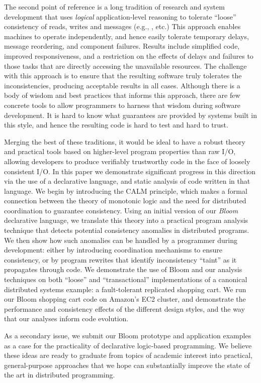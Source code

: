 The second point of reference is a long tradition of research and system development that uses {\em logical} application-level reasoning to tolerate ``loose'' consistency of reads, writes and messages (e.g., \cite{sagas,base,acid20,quicksand}, etc.)  This approach enables machines to operate independently, and hence easily tolerate temporary delays, message reordering, and component failures.  Results include simplified code, improved responsiveness, and a restriction on the effects of delays and failures to those tasks that are directly accessing the unavailable resources.  The challenge with this approach is to ensure that the resulting software truly tolerates the inconsistencies, producing acceptable results in all cases.  Although there is a body of wisdom and best practices that informs this approach, there are few concrete tools to allow programmers to harness that wisdom during software development.  It is hard to know what guarantees are provided by systems built in this style, and hence the resulting code is hard to test and hard to trust.  

Merging the best of these traditions, it would be ideal to have a robust theory and practical tools based on higher-level program properties than raw I/O, allowing developers to produce verifiably trustworthy code in the face of loosely consistent I/O.  In this paper we demonstrate significant progress in this direction via the use of a declarative language, and static analysis of code written in that language.  We begin by introducing the CALM principle, which makes a formal connection between the theory of monotonic logic and the need for distributed coordination to guarantee consistency.  Using an initial version of our {\em Bloom} declarative language, we translate this theory into a practical program analysis technique that detects potential consistency anomalies in distributed programs.  We then show how such anomalies can be handled by a programmer during development: either by introducing coordination mechanisms to ensure consistency, or by program rewrites that identify inconsistency ``taint'' as it propagates through code.  We demonstrate the use of Bloom and our analysis techniques on both ``loose'' and ``transactional'' implementations of a canonical distributed systems example: a fault-tolerant replicated shopping cart.  We run our Bloom shopping cart code on Amazon's EC2 cluster, and demonstrate the performance and consistency effects of the different design styles, and the way that our analyses inform code evolution.

As a secondary issue, we submit our Bloom prototype and application examples as a case for the practicality of declarative logic-based programming.  We believe these ideas are ready to graduate from topics of academic interest into practical, general-purpose approaches that we hope can substantially improve the state of the art in distributed programming.

